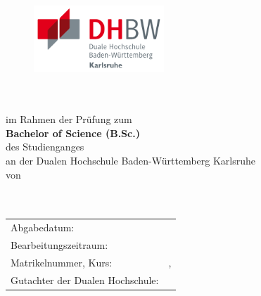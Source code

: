 \thispagestyle{empty}
\begin{titlepage}
\enlargethispage{4cm}

\begin{figure}           %
	\hfill
	\begin{minipage}{0.49\textwidth}
		\centering
		\includegraphics[height=2.5cm]{Bilder/Logos/Logo_DHBW.pdf} 
	\end{minipage}
\end{figure} 
\vspace*{0.1cm}

\begin{center}
	\huge{\textbf{\titel}}\\[1.5cm]
	\Large{\textbf{\arbeit}}\\[0.5cm]
	\normalsize{im Rahmen der Prüfung zum\\[1ex] \textbf{Bachelor of Science (B.Sc.)}}\\[0.5cm]
	\Large{des Studienganges \studiengang}\\[1ex]
	\normalsize{an der Dualen Hochschule Baden-Württemberg Karlsruhe}\\[1cm]
	\normalsize{von}\\[1ex] \Large{\textbf{\autor}} \\[1cm]
	\normalsize{\bearbeitungsmonat}\\[1ex] %
\end{center}

\begin{center}
	\vfill
	\begin{tabular}{ll}
		Abgabedatum:                     & \abgabe \\[0.2cm]
		Bearbeitungszeitraum:            & \bearbeitungszeitraum \\[0.2cm]
		Matrikelnummer, Kurs:            & \matrikelnr , \kurs \\[0.2cm]
		Gutachter der Dualen Hochschule: & \betreuerDhbw \\[2cm]
	\end{tabular} 
\end{center}
\end{titlepage}
